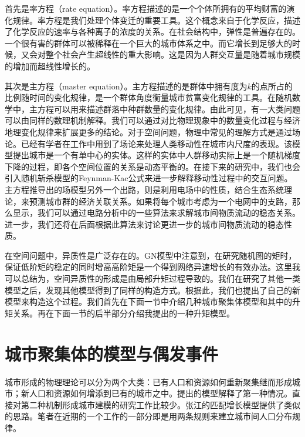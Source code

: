 首先是率方程（rate equation）。率方程描述的是一个个体所拥有的平均财富的演化规律。率方程是我们处理个体变迁的重要工具。这个概念来自于化学反应，描述了化学反应的速率与各种离子的浓度的关系。在社会结构中，弹性\cite{gao2016universal}是普遍存在的。一个很有害的群体可以被稀释在一个巨大的城市体系之中。而它增长到足够大的时候，又会对整个社会产生超线性的重大影响\cite{schlapfer2014scaling}。这是因为人群交互量是随着城市规模的增加而超线性增长的。

其次是主方程（master equation）。主方程描述的是群体中拥有度为$k$的点所占的比例随时间的变化规律，是一个群体角度衡量城市贫富变化规律的工具。在随机数学中，主方程可以用来描述群落中种群数量的变化规律。由此可见，有一大类问题可以由同样的数理机制解释。我们可以通过对比物理现象中的数量变化过程与经济地理变化规律来扩展更多的结论。对于空间问题，物理中常见的理解方式是通过场论。已经有学者在工作中用到了场论来处理人类移动性在城市内尺度的表现\cite{molas2017field}。该模型提出城市是一个有单中心的实体。这样的实体中人群移动实际上是一个随机梯度下降的过程，即各个空间位置的关系是动态平衡的。在接下来的研究中，我们也会引入随机斩杀模型的Feynman-Kac公式\cite{PhysRevE.98.052114}来进一步解释移动性过程中的交互问题。主方程推导出的场模型另外一个出路，则是利用电场中的性质，结合生态系统理论，来预测城市群的经济关联关系。如果将每个城市考虑为一个电网中的支路，那么\cite{doyle1984random,Volchenkov2011Random}显示，我们可以通过电路分析中的一些算法来求解城市间物质流动的稳态关系。进一步，我们还将在后面根据此算法来讨论更进一步的城市间物质流动的稳态性质。

在空间问题中，异质性是广泛存在的。GN模型中注意到，在研究随机图的矩时，保证低阶矩的稳定的同时增高高阶矩是一个得到网络异速增长的有效办法。这里我可以总结为，空间异质性的形成是由局部升矩过程导致的。我们在研究了其他一类模型之后，发现其他模型得到了同样的构造方式。根据此，我们也提出了自己的新模型来构造这个过程。我们首先在下面一节中介绍几种城市聚集体模型和其中的升矩关系。再在下面一节的后半部分介绍我提出的一种升矩模型。

\section{城市聚集体的模型与偶发事件}

城市形成的物理理论可以分为两个大类：已有人口和资源如何重新聚集继而形成城市；新人口和资源如何增添到已有的城市之中。\cite{PhysRevLett.79.523,PhysRevE.58.295,PhysRevLett.112.240601}提出的模型解释了第一种情况。直接对第二种机制形成城市建模的研究工作比较少。张江\cite{ZhangScaling,LiSimple}的匹配增长模型提供了类似的思路。笔者在近期的一个工作的一部分即是用两条规则来建立城市间人口分布规律。

